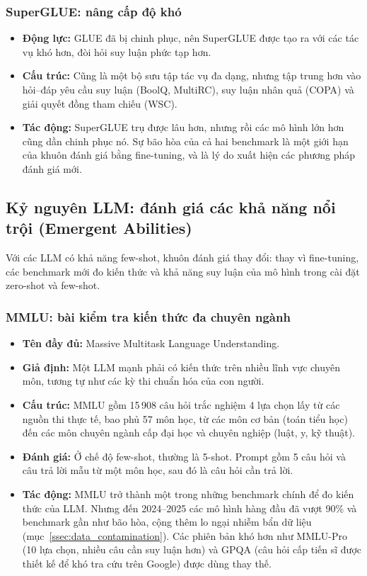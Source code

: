 \subsubsection{SuperGLUE: nâng cấp độ khó}
\begin{itemize}
    \item \textbf{Động lực:} GLUE đã bị chinh phục, nên SuperGLUE được tạo ra với các tác vụ khó hơn, đòi hỏi suy luận phức tạp hơn.
    \item \textbf{Cấu trúc:} Cũng là một bộ sưu tập tác vụ đa dạng, nhưng tập trung hơn vào hỏi--đáp yêu cầu suy luận (BoolQ, MultiRC), suy luận nhân quả (COPA) và giải quyết đồng tham chiếu (WSC).
    \item \textbf{Tác động:} SuperGLUE trụ được lâu hơn, nhưng rồi các mô hình lớn hơn cũng dần chinh phục nó. Sự bão hòa của cả hai benchmark là một giới hạn của khuôn đánh giá bằng fine-tuning, và là lý do xuất hiện các phương pháp đánh giá mới.
\end{itemize}

\subsection{Kỷ nguyên LLM: đánh giá các khả năng nổi trội (Emergent Abilities)}
\label{ssec:llm_benchmarks}
Với các LLM có khả năng few-shot, khuôn đánh giá thay đổi: thay vì fine-tuning, các benchmark mới đo kiến thức và khả năng suy luận của mô hình trong cài đặt zero-shot và few-shot.

\subsubsection{MMLU: bài kiểm tra kiến thức đa chuyên ngành}
\begin{itemize}
    \item \textbf{Tên đầy đủ:} Massive Multitask Language Understanding.
    \item \textbf{Giả định:} Một LLM mạnh phải có kiến thức trên nhiều lĩnh vực chuyên môn, tương tự như các kỳ thi chuẩn hóa của con người.
    \item \textbf{Cấu trúc:} MMLU \cite{hendrycks2021mmlu} gồm 15\,908 câu hỏi trắc nghiệm 4 lựa chọn lấy từ các nguồn thi thực tế, bao phủ 57 môn học, từ các môn cơ bản (toán tiểu học) đến các môn chuyên ngành cấp đại học và chuyên nghiệp (luật, y, kỹ thuật).
    \item \textbf{Đánh giá:} Ở chế độ few-shot, thường là 5-shot. Prompt gồm 5 câu hỏi và câu trả lời mẫu từ một môn học, sau đó là câu hỏi cần trả lời.
    \item \textbf{Tác động:} MMLU trở thành một trong những benchmark chính để đo kiến thức của LLM. Nhưng đến 2024--2025 các mô hình hàng đầu đã vượt 90\% và benchmark gần như bão hòa, cộng thêm lo ngại nhiễm bẩn dữ liệu (mục~\ref{ssec:data_contamination}). Các phiên bản khó hơn như MMLU-Pro (10 lựa chọn, nhiều câu cần suy luận hơn) và GPQA (câu hỏi cấp tiến sĩ được thiết kế để khó tra cứu trên Google) được dùng thay thế.
\end{itemize}

